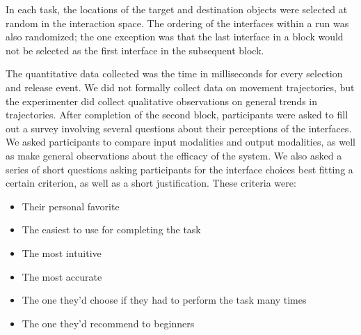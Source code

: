 \documentclass[pageno]{jpaper}
\begin{document}
In each task, the locations of the target and destination objects were selected at random in the interaction space. The
ordering of the interfaces within a run was also randomized; the one exception was that the last interface in a block
would not be selected as the first interface in the subsequent block.

The quantitative data collected was the time in milliseconds for every selection and release event. We did not formally
collect data on movement trajectories, but the experimenter did collect qualitative observations on general trends in
trajectories. After completion of the second block, participants were asked to fill out a survey involving several questions
about their perceptions of the interfaces. We asked participants to compare input modalities and output modalities, as well as
make general observations about the efficacy of the system. We also asked a series of short questions asking participants for
the interface choices best fitting a certain criterion, as well as a short justification. These criteria were:
\begin{itemize}
\item Their personal favorite
\item The easiest to use for completing the task
\item The most intuitive
\item The most accurate
\item The one they'd choose if they had to perform the task many times
\item The one they'd recommend to beginners
\end{itemize}
\end{document}
